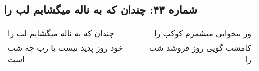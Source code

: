 \begin{center}
\section*{شماره ۴۳: چندان که به ناله میگشایم لب را}
\label{sec:043}
\begin{longtable}{l p{0.5cm} r}
چندان که به ناله میگشایم لب را
&&
وز بیخوابی میشمرم کوکب را
\\
خود روز پدید نیست یا رب چه شب است
&&
کامشب گویی روز فروشد شب را
\\
\end{longtable}
\end{center}
